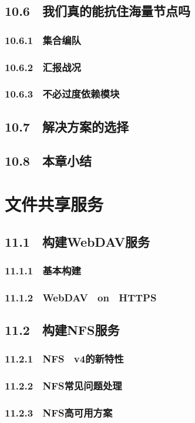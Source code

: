 \documentclass[12pt,UTF8]{ctexbook}
\begin{document}
{\section{10.6　我们真的能抗住海量节点吗}
\subsection{10.6.1　集合编队}
\subsection{10.6.2　汇报战况}
\subsection{10.6.3　不必过度依赖模块}
\section{10.7　解决方案的选择}
\section{10.8　本章小结}
\chapter{文件共享服务}
\section{11.1　构建WebDAV服务}
\subsection{11.1.1　基本构建}
\subsection{11.1.2　WebDAV　on　HTTPS}
\section{11.2　构建NFS服务}
\subsection{11.2.1　NFS　v4的新特性}
\subsection{11.2.2　NFS常见问题处理}
\subsection{11.2.3　NFS高可用方案}
}
\end{document}
